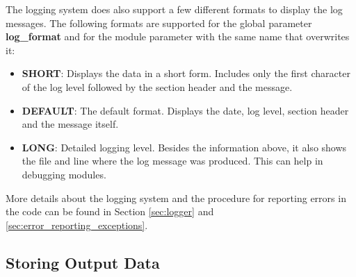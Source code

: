 The logging system does also support a few different formats to display the log messages. The following formats are supported for the global parameter \textbf{log\_format} and for the module parameter with the same name that overwrites it:
\begin{itemize}
\item \textbf{SHORT}: Displays the data in a short form. Includes only the first character of the log level followed by the section header and the message.
\item \textbf{DEFAULT}: The default format. Displays the date, log level, section header and the message itself. 
\item \textbf{LONG}: Detailed logging level. Besides the information above, it also shows the file and line where the log message was produced. This can help in debugging modules.
\end{itemize}

More details about the logging system and the procedure for reporting errors in the code can be found in Section \ref{sec:logger} and \ref{sec:error_reporting_exceptions}.

\subsection{Storing Output Data}
\wip
